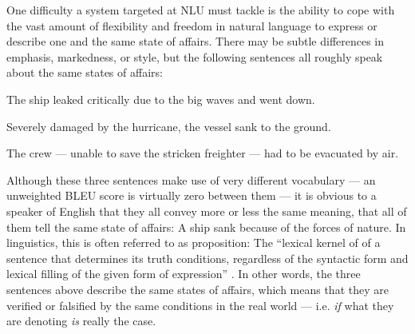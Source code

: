 
One difficulty a system targeted at NLU must tackle is the ability to cope with the
vast amount of flexibility and freedom in natural language to express or describe
one and the same state of affairs. There may be subtle differences in emphasis,
markedness, or style, but the following sentences all roughly speak about the same
states of affairs:

\begin{examples}
  \item The ship leaked critically due to the big waves and went down.
  \item \label{ex:sinking-sent} Severely damaged by the hurricane, the vessel sank to the ground.
  \item The crew --- unable to save the stricken freighter --- had to be evacuated by air.
\end{examples}

Although these three sentences make use of very different vocabulary --- an unweighted BLEU score
is virtually zero between them --- it is obvious to a speaker of English that they all convey more
or less the same meaning, that all of them tell the same state of affairs: A ship sank because
of the forces of nature. In linguistics, this is often referred to as proposition: The ``lexical
kernel of of a sentence that determines its truth conditions, regardless of the syntactic form and
lexical filling of the given form of expression'' \cite[p.~959]{bussmann2006routledge}. In other
words, the three sentences above describe the same states of affairs, which means that they are
verified or falsified by the same conditions in the real world --- i.e. \emph{if} what they are
denoting \emph{is} really the case.

